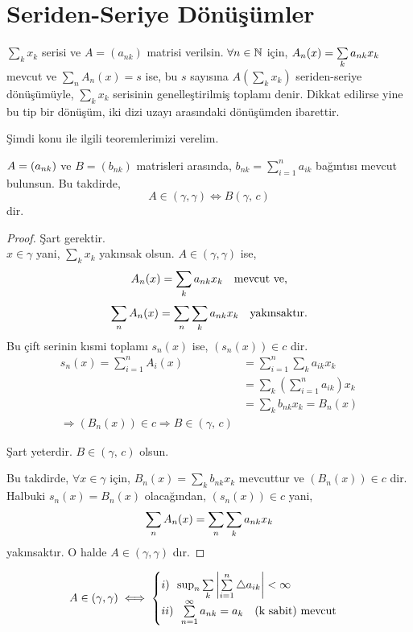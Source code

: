 \section{Seriden-Seriye Dönüşümler}
$\sum_kx_k$ serisi ve $A=(a_{nk})$ matrisi verilsin. $\forall n\in\mathbb{N}$ için, $A_n(x)=\sum\limits_ka_{nk}x_k$ mevcut ve $\sum_nA_n(x)=s$ ise, bu $s$ sayısına $A\left(\sum\limits_kx_k\right)$ seriden-seriye dönüşümüyle, $\sum\limits_kx_k$ serisinin genelleştirilmiş toplamı denir. Dikkat edilirse yine bu tip bir dönüşüm, iki dizi uzayı arasındaki dönüşümden ibarettir.

Şimdi konu ile ilgili teoremlerimizi verelim.

\begin{theorem}
$A=(a_{nk})$ ve $B=(b_{nk})$ matrisleri arasında, $b_{nk}=\sum\limits_{i=1}^n a_{ik}$ bağıntısı mevcut bulunsun. Bu takdirde,
$$
A\in(\gamma,\gamma)\iff B(\gamma,\,c)
$$dir.
\end{theorem}
\begin{proof}
Şart gerektir.\\[5pt]
$x\in\gamma$ yani, $\sum_kx_k$ yakınsak olsun. $A\in(\gamma, \gamma)$ ise,
$$
A_n(x)=\sum\limits_ka_{nk}x_k\quad\text{mevcut ve,}
$$
$$
\sum_nA_n(x)=\sum_n\sum\limits_ka_{nk}x_k\quad\text{yakınsaktır.}
$$
Bu çift serinin kısmi toplamı $s_n(x)$ ise, $(s_n(x))\in c$ dir.
$$
\begin{aligned}
s_n(x)=\sum\limits_{i=1}^nA_i(x)&=\sum\limits_{i=1}^n\sum_ka_{ik}x_k\\
&=\sum_k\left(\sum\limits_{i=1}^na_{ik}\right)x_k\\
&=\sum_kb_{nk}x_k=B_n(x)\\
\Rightarrow(B_n(x))\in c\Rightarrow B\in(\gamma,\,c)
\end{aligned}
$$

Şart yeterdir. $B\in(\gamma,\,c)$ olsun. 

Bu takdirde, $\forall x\in\gamma$ için,
$B_n(x)=\sum_kb_{nk}x_k$ mevcuttur ve $(B_n(x))\in c$ dir. Halbuki $s_n(x)=B_n(x)$ olacağından, $(s_n(x))\in c$ yani,
$$
\sum_nA_n(x)=\sum_n\sum\limits_ka_{nk}x_k
$$
yakınsaktır. O halde $A\in(\gamma,\gamma)$ dır.
\end{proof}
\begin{corollary}
$$
A\in(\gamma,\gamma)\iff
\begin{cases}
i) \,\,\,\sup_n\sum\limits_k\left|\sum\limits_{i=1}^n\bigtriangleup a_{ik}\right|<\infty\\
ii) \,\,\, \sum\limits_{n=1}^\infty a_{nk}=a_k\quad\text{(k sabit) mevcut}
\end{cases}
$$
\end{corollary}
